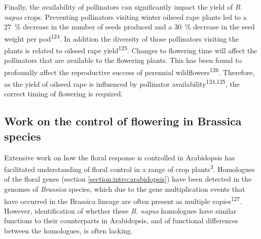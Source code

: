 \documentclass[12pt,]{book}
\begin{document}
Finally, the availability of pollinators can significantly impact the
yield of \emph{B. napus} crops. Preventing pollinators visiting winter
oilseed rape plants led to a 27~\% decrease in the number of seeds
produced and a 30~\% decrease in the seed weight per
pod\textsuperscript{124}. In addition the diversity of those pollinators
visiting the plants is related to oilseed rape
yield\textsuperscript{125}. Changes to flowering time will affect the
pollinators that are available to the flowering plants. This has been
found to profoundly affect the reproductive success of perennial
wildflowers\textsuperscript{126}. Therefore, as the yield of oilseed
rape is influenced by pollinator availability\textsuperscript{124,125},
the correct timing of flowering is required.

\subsection{Work on the control of flowering in Brassica
species}\label{section:intro:brassicafloweringgenes}

Extensive work on how the floral response is controlled in Arabidopsis
has facilitated understanding of floral control in a range of crop
plants\textsuperscript{3}. Homologues of the floral genes (section
\ref{section:intro:arabidopsis}) have been detected in the genomes of
\emph{Brassica} species, which due to the gene multiplication events
that have occurred in the Brassica lineage are often present as multiple
copies\textsuperscript{127}. However, identification of whether these
\emph{B. napus} homologues have similar functions to their counterparts
in Arabidopsis, and of functional differences between the homologues, is
often lacking.
\end{document}
